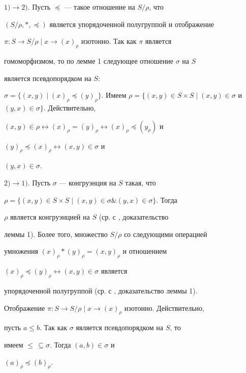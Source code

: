 \begin{pf} 


$1)\to 2)$. Пусть $\preceq$ --- такое отношение на $S/\rho$, что 


$(S/\rho,*,\preceq)$ является упорядоченной полугруппой и отображение 


$\pi:S\to S/\rho\mid x\to(x)_\rho$ изотонно. Так как $\pi$ является 


гомоморфизмом, то по лемме 1 следующее отношение $\sigma$ на $S$ 


является псевдопорядком на $S$: 


$\sigma=\{(x,y)\mid(x)_\rho\preceq(y)_\rho\}$. Имеем $\rho=\{(x,y)\in 


S\times S\mid(x,y)\in\sigma$ и $(y,x)\in\sigma\}$. Действительно, 


$(x,y)\in\rho\leftrightarrow(x)_\rho=(y)_\rho\leftrightarrow 


(x)_\rho\preceq(y_\rho)$ и 


$(y)_\rho\preceq(x)_\rho\leftrightarrow(x,y)\in\sigma$ и 


$(y,x)\in\sigma$. 


 


$2)\to 1)$. Пусть $\sigma$ --- конгруэнция на $S$ такая, что 


$\rho=\{(x,y)\in S\times S\mid(x,y)\in\sigma\&(y,x)\in\sigma\}$. Тогда 


$\rho$ является конгруэнцией на $S$ (ср. с \cite{4}, доказательство 


леммы 1). Более того, множество $S/\rho$ со следующими операцией 


умножения $(x)_\rho*(y)_\rho=(x,y)_\rho$ и отношением 


$(x)_\rho\preceq(y)_\rho\leftrightarrow(x,y)\in\sigma$ является 


упорядоченной полугруппой (ср. с \cite{4}, доказательство леммы 1). 


Отображение $\pi:S\to S/\rho\mid x\to(x)_\rho$ изотонно. Действительно, 


пусть $a\le b$. Так как $\sigma$ является псевдопорядком на $S$, то 


имеем $\le\,\subseteq\sigma$. Тогда $(a,b)\in\sigma$ и 


$(a)_\rho\preceq(b)_\rho$. 


\end{pf} 


 



